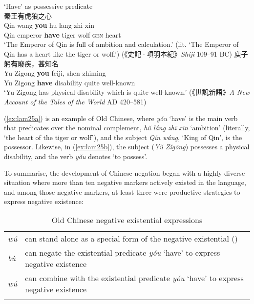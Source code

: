 \documentclass[output=paper]{langscibook}
\begin{document}
\ea `Have' as possessive predicate \label{ex:lam25}\\
  \ea 秦王\textbf{有}虎狼之心 \label{ex:lam25a}\\
  	\gll Qin	wang \textbf{you} hu lang zhi xin\\
  	Qin	emperor	\textbf{have} tiger wolf \textsc{gen} heart\\
  	\glt `The Emperor of Qin is full of ambition and calculation.' (lit. `The Emperor of Qin has a heart like the tiger or wolf.') (《史記·項羽本紀》\emph{Shiji} 109–91 BC)
  \ex 庾子躬\textbf{有}廢疾，甚知名 \label{ex:lam25b}\\
  	\gll Yu Zigong \textbf{you} feiji, shen zhiming\\
  	Yu Zigong \textbf{have} disability quite	well-known\\
  	\glt `Yu Zigong has physical disability which is quite well-known.' (《世說新語》\emph{A New Account of the Tales of the World} AD 420–581)
\z \z

(\ref{ex:lam25a}) is an example of Old Chinese, where \textit{yǒu} `have' is the main verb that predicates over the nominal complement, \textit{hǔ láng zhī xīn} `ambition' (literally, `the heart of the tiger or wolf'), and the subject \textit{Qín wáng}, `King of Qin', is the possessor. Likewise, in (\ref{ex:lam25b}), the subject (\emph{Yǔ Zǐgōng}) possesses a physical disability, and the verb \textit{yǒu} denotes `to possess'. 

To summarise, the development of Chinese negation began with a highly diverse situation where more than ten negative markers actively existed in the language, and among those negative markers, at least three were productive strategies to express negative existence:


\begin{table}
  \begin{tabularx}{\textwidth}{L{1.5cm}X}
    \lsptoprule
\textit{wú} & can stand alone as a special form of the negative existential (\citealt{Zhang2002})\\
\textit{bù} & can negate the existential predicate \textit{yǒu} `have' to express negative existence\\ 
\textit{wú} & can combine with the existential predicate \textit{yǒu} `have' to express negative existence\\
\lspbottomrule
\end{tabularx}
  \caption{Old Chinese negative existential expressions}
  \label{ex:lam26}
\end{table}
\end{document}
